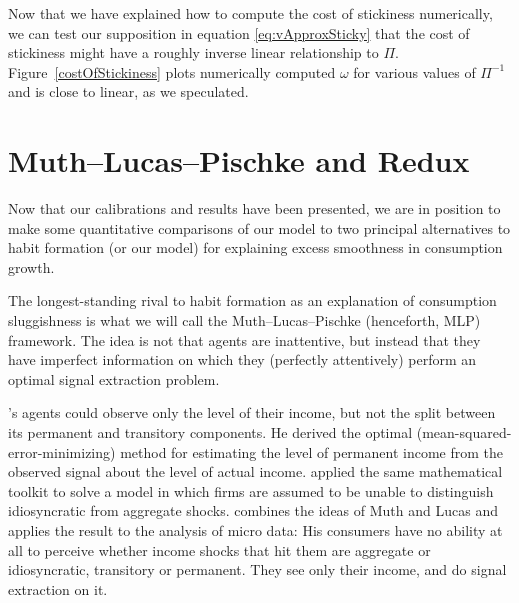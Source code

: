 \documentclass[titlepage]{\econtex}\newcommand{\texname}{cAndCwithStickyE}
\begin{document}
Now that we have explained how to compute the cost of stickiness numerically, we can test our supposition in equation \eqref{eq:vApproxSticky} that the cost of stickiness might have a roughly inverse linear relationship to $\Pi$.  Figure~\ref{costOfStickiness} plots numerically computed $\omega$ for various values of $\Pi^{-1}$ and is close to linear, as we speculated.



\section{Muth--Lucas--Pischke and \cite{reis:inattentive} Redux} \label{sec:Comparisons}

Now that our calibrations and results have been presented, we are in position to make some quantitative comparisons of our model to two principal alternatives to habit formation (or our model) for explaining excess smoothness in consumption growth.

The longest-standing rival to habit formation as an explanation of consumption sluggishness is what we will call the Muth--Lucas--Pischke (henceforth, MLP) framework.  The idea is not that agents are inattentive, but instead that they have imperfect information on which they (perfectly attentively) perform an optimal signal extraction problem.

\cite{muthOptimal}'s agents could observe only the level of their income, but not the split between its permanent and transitory components.  He derived the optimal (mean-squared-error-minimizing) method for estimating the level of permanent income from the observed signal about the level of actual income.  \cite{lucas:imperfectInfo} applied the same mathematical toolkit to solve a model in which firms are assumed to be unable to distinguish idiosyncratic from aggregate shocks.  \cite{pischkeMicroMacro} combines the ideas of Muth and Lucas and applies the result to the analysis of micro data: His consumers have no ability at all to perceive whether income shocks that hit them are aggregate or idiosyncratic, transitory or permanent.  They see only their income, and do signal extraction on it.
\end{document}
